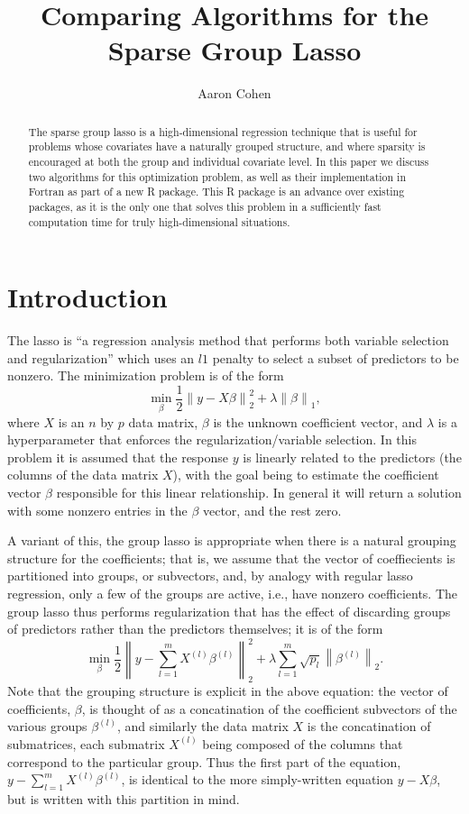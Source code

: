 \documentclass[12pt]{article}
\title{Comparing Algorithms for the Sparse Group Lasso}
\author{Aaron Cohen}
\newcommand{\norm}[1]{\left\lVert #1 \right\rVert}
\begin{document}
    \maketitle
    \begin{abstract}
        The sparse group lasso is a high-dimensional regression technique that is useful for problems whose covariates have a naturally grouped structure, and where sparsity is encouraged at both the group and individual covariate level. In this paper we discuss two algorithms for this optimization problem, as well as their implementation in Fortran as part of a new R package. This R package is an advance over existing packages, as it is the only one that solves this problem in a sufficiently fast computation time for truly high-dimensional situations.
    \end{abstract}

\section{Introduction}
\label{Sec:intro}
The lasso is ``a regression analysis method that performs both variable selection and regularization'' which uses an $l1$ penalty \citep{tibshirani1996regression} to select a subset of predictors to be nonzero. The minimization problem is of the form
\[
\min_{\beta} \frac{1}{2}\norm{y-X\beta}_2^2 + \lambda \norm{\beta}_1,
\]
where $X$ is an $n$ by $p$ data matrix, $\beta$ is the unknown coefficient vector, and $\lambda$ is a hyperparameter that enforces the regularization/variable selection. In this problem it is assumed that the response $y$ is linearly related to the predictors (the columns of the data matrix $X$), with the goal being to estimate the coefficient vector $\beta$ responsible for this linear relationship. In general it will return a solution with some nonzero entries in the $\beta$ vector, and the rest zero.

A variant of this, the group lasso \citep{yuan2006model} is appropriate when there is a natural grouping structure for the coefficients; that is, we assume that the vector of coeffiecients is partitioned into groups, or subvectors, and, by analogy with regular lasso regression, only a few of the groups are active, i.e., have nonzero coefficients. The group lasso thus performs regularization that has the effect of discarding groups of predictors rather than the predictors themselves; it is of the form 
\[
\min_{\beta}\frac{1}{2}\norm{y-\sum_{l=1}^mX^{(l)}\beta^{(l)}}_2^2 + \lambda\sum_{l=1}^m\sqrt{p_l}\norm{\beta^{(l)}}_2.
\]
Note that the grouping structure is explicit in the above equation: the vector of coefficients, $\beta$, is thought of as a concatination of the coefficient subvectors of the various groups $\beta^{(l)}$, and similarly the data matrix $X$ is the concatination of submatrices, each submatrix $X^{(l)}$ being composed of the columns that correspond to the particular group. Thus the first part of the equation, $y-\sum_{l=1}^mX^{(l)}\beta^{(l)}$, is identical to the more simply-written equation $y-X\beta$, but is written with this partition in mind. 
\end{document}
